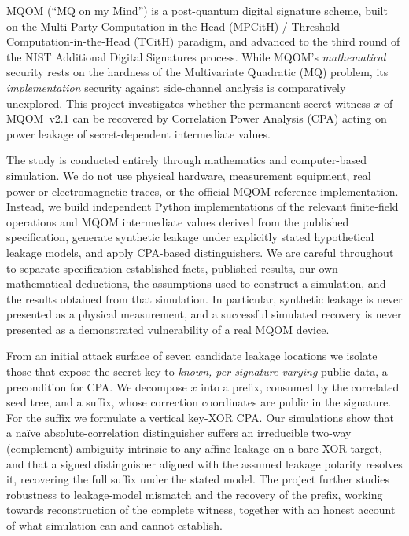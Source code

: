 MQOM (``MQ on my Mind'') is a post-quantum digital signature scheme, built on the
Multi-Party-Computation-in-the-Head (MPCitH) / Threshold-Computation-in-the-Head (TCitH)
paradigm, and advanced to the third round of the NIST Additional Digital Signatures
process. While MQOM's \emph{mathematical} security rests on the hardness of the
Multivariate Quadratic (MQ) problem, its \emph{implementation} security against
side-channel analysis is comparatively unexplored. This project investigates whether
the permanent secret witness $x$ of MQOM~v2.1 can be recovered by Correlation Power
Analysis (CPA) acting on power leakage of secret-dependent intermediate values.

The study is conducted entirely through mathematics and computer-based simulation. We
do not use physical hardware, measurement equipment, real power or electromagnetic
traces, or the official MQOM reference implementation. Instead, we build independent
Python implementations of the relevant finite-field operations and MQOM intermediate
values derived from the published specification, generate synthetic leakage under
explicitly stated hypothetical leakage models, and apply CPA-based distinguishers. We
are careful throughout to separate specification-established facts, published results,
our own mathematical deductions, the assumptions used to construct a simulation, and
the results obtained from that simulation. In particular, synthetic leakage is never
presented as a physical measurement, and a successful simulated recovery is never
presented as a demonstrated vulnerability of a real MQOM device.

From an initial attack surface of seven candidate leakage locations we isolate those
that expose the secret key to \emph{known, per-signature-varying} public data, a
precondition for CPA. We decompose $x$ into a prefix, consumed by the correlated seed
tree, and a suffix, whose correction coordinates are public in the signature. For the
suffix we formulate a vertical key-XOR CPA. Our simulations show that a na\"ive
absolute-correlation distinguisher suffers an irreducible two-way (complement)
ambiguity intrinsic to any affine leakage on a bare-XOR target, and that a signed
distinguisher aligned with the assumed leakage polarity resolves it, recovering the
full suffix under the stated model. The project further studies robustness to
leakage-model mismatch and the recovery of the prefix, working towards reconstruction
of the complete witness, together with an honest account of what simulation can and
cannot establish.
